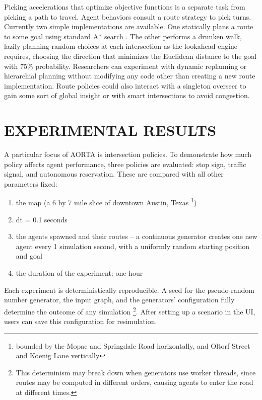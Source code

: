 \documentclass[letterpaper, 10 pt, conference]{ieeeconf}  %
\begin{document}
Picking accelerations that optimize objective functions is a separate task from
picking a path to travel. Agent behaviors consult a route strategy to pick
turns. Currently two simple implementations are available. One statically plans
a route to some goal using standard A* search \cite{astar}. The other performs a
drunken walk, lazily planning random choices at each intersection as the
lookahead engine requires, choosing the direction that minimizes the Euclidean
distance to the goal with 75\% probability. Researchers can experiment with
dynamic replanning or hierarchial planning without modifying any code other than
creating a new route implementation. Route policies could also interact with a
singleton overseer to gain some sort of global insight or with smart
intersections to avoid congestion.


\section{EXPERIMENTAL RESULTS}
\label{sec:results}

A particular focus of AORTA is intersection policies. To demonstrate how much
policy affects agent performance, three policies are evaluated: stop sign,
traffic signal, and autonomous reservation. These are compared with all other
parameters fixed:

\begin{enumerate}
  \item the map (a 6 by 7 mile slice of downtown Austin, Texas
        \footnote{bounded by the Mopac and Springdale Road horizontally,
        and Oltorf Street and Koenig Lane vertically})
  \item dt = 0.1 seconds
  \item the agents spawned and their routes -- a continuous generator creates
        one new agent every 1 simulation second, with a uniformly random
        starting position and goal
  \item the duration of the experiment: one hour
\end{enumerate}

Each experiment is deterministically reproducible. A seed for the pseudo-random
number generator, the input graph, and the generators' configuration fully
determine the outcome of any simulation \footnote{This determinism may break
  down when generators use worker threads, since routes may be computed in
different orders, causing agents to enter the road at different times.}. After
setting up a scenario in the UI, users can save this configuration for
resimulation.
\end{document}
